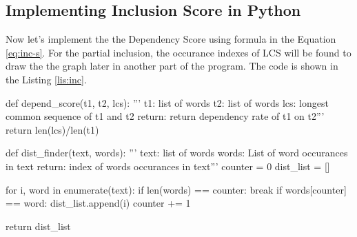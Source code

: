 \subsection{Implementing Inclusion Score in Python}
Now let's implement the the Dependency Score using formula in the
Equation \ref{eq:inc-s}. For the partial inclusion, the occurance
indexes of LCS will be found to draw the the graph later in another
part of the program. The code is shown in the Listing \ref{lis:inc}.
\begin{python}[caption=Inclusion Score, label=lis:inc]
def depend_score(t1, t2, lcs):
    '''
    t1: list of words
    t2: list of words
    lcs: longest common sequence of t1 and t2
    return: return dependency rate of t1 on t2'''
    return  len(lcs)/len(t1)


def dist_finder(text, words):
    '''
    text: list of words
    words: List of word occurances in text
    return: index of words occurances in text'''
    counter = 0
    dist_list = []

    for i, word in enumerate(text):
        if len(words) == counter:
            break
        if words[counter] == word:
            dist_list.append(i)
            counter += 1

    return dist_list
\end{python}